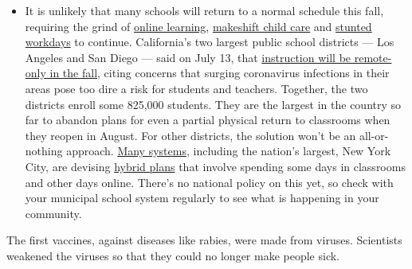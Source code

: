 \begin{itemize}
  \begin{itemize}
  \tightlist
  \item
    It is unlikely that many schools will return to a normal schedule
    this fall, requiring the grind of
    \href{https://www.nytimes3xbfgragh.onion/2020/06/05/us/coronavirus-education-lost-learning.html?action=click\&pgtype=Article\&state=default\&region=MAIN_CONTENT_3\&context=storylines_faq}{online
    learning},
    \href{https://www.nytimes3xbfgragh.onion/2020/05/29/us/coronavirus-child-care-centers.html?action=click\&pgtype=Article\&state=default\&region=MAIN_CONTENT_3\&context=storylines_faq}{makeshift
    child care} and
    \href{https://www.nytimes3xbfgragh.onion/2020/06/03/business/economy/coronavirus-working-women.html?action=click\&pgtype=Article\&state=default\&region=MAIN_CONTENT_3\&context=storylines_faq}{stunted
    workdays} to continue. California's two largest public school
    districts --- Los Angeles and San Diego --- said on July 13, that
    \href{https://www.nytimes3xbfgragh.onion/2020/07/13/us/lausd-san-diego-school-reopening.html?action=click\&pgtype=Article\&state=default\&region=MAIN_CONTENT_3\&context=storylines_faq}{instruction
    will be remote-only in the fall}, citing concerns that surging
    coronavirus infections in their areas pose too dire a risk for
    students and teachers. Together, the two districts enroll some
    825,000 students. They are the largest in the country so far to
    abandon plans for even a partial physical return to classrooms when
    they reopen in August. For other districts, the solution won't be an
    all-or-nothing approach.
    \href{https://bioethics.jhu.edu/research-and-outreach/projects/eschool-initiative/school-policy-tracker/}{Many
    systems}, including the nation's largest, New York City, are
    devising
    \href{https://www.nytimes3xbfgragh.onion/2020/06/26/us/coronavirus-schools-reopen-fall.html?action=click\&pgtype=Article\&state=default\&region=MAIN_CONTENT_3\&context=storylines_faq}{hybrid
    plans} that involve spending some days in classrooms and other days
    online. There's no national policy on this yet, so check with your
    municipal school system regularly to see what is happening in your
    community.
  \end{itemize}
\end{itemize}

The first vaccines, against diseases like rabies, were made from
viruses. Scientists weakened the viruses so that they could no longer
make people sick.

